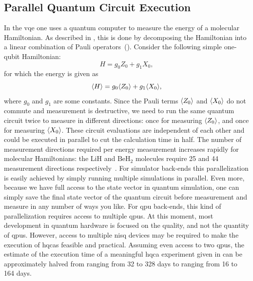 \subsection{Parallel Quantum Circuit Execution} \label{sec:parallel-qpu}
In the \gls{vqe} one uses a quantum computer to measure the energy of a molecular Hamiltonian.
As described in , this is done by decomposing the Hamiltonian into a linear combination of Pauli operators~().
Consider the following simple one-qubit Hamiltonian:
\begin{equation}
H = g_0Z_0 + g_1X_0,
\end{equation}
for which the energy is given as
\begin{equation}
\langle{H}\rangle = g_0\langle{Z_0}\rangle + g_1\langle{X_0}\rangle,
\end{equation}
where $g_0$ and $g_1$ are some constants.
Since the Pauli terms $\langle{Z_0}\rangle$ and $\langle{X_0}\rangle$ do not commute and measurement is destructive, we need to run the same quantum circuit twice to measure in different directions: once for measuring $\langle{Z_0}\rangle$, and once for measuring $\langle{X_0}\rangle$.
These circuit evaluations are independent of each other and could be executed in parallel to cut the calculation time in half.
The number of measurement directions required per energy measurement increases rapidly for molecular Hamiltonians: the LiH and $\ensuremath{\mathrm{BeH_2}}$ molecules require 25 and 44 measurement directions respectively~\cite[Supplementary Information, Section III]{kandala2017hardware}.
For simulator back-ends this parallelization is easily achieved by simply running multiple simulations in parallel.
Even more, because we have full access to the state vector in quantum simulation, one can simply save the final state vector of the quantum circuit before measurement and measure in any number of ways you like.
For \gls{qpu} back-ends, this kind of parallelization requires access to multiple \glspl{qpu}.
At this moment, most development in quantum hardware is focused on the quality, and not the quantity of \glspl{qpu}.
However, access to multiple \gls{nisq} devices may be required to make the execution of \glspl{hqca} feasible and practical.
Assuming even access to two \glspl{qpu}, the estimate of the execution time of a meaningful \gls{hqca} experiment given in  can be approximately halved from ranging from 32 to 328 days to ranging from 16 to 164 days.

